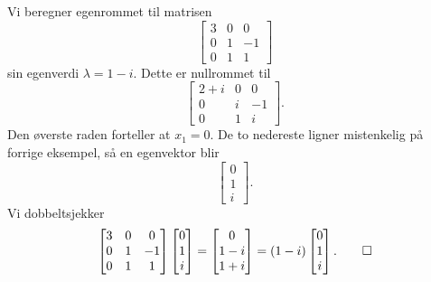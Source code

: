 \begin{ex}
Vi beregner egenrommet til matrisen
\[
\begin{bmatrix}
3 & 0 & 0 \\ 0 & 1 & -1 \\ 0&  1 &1  
\end{bmatrix}
\]
sin egenverdi $\lambda= 1-i$. Dette er nullrommet til
\[
\begin{bmatrix}
2+i & 0 & 0 \\ 0 & i & -1 \\ 0&  1 &i  
\end{bmatrix}.
\]
Den øverste raden forteller at $x_1=0$. De to nedereste ligner mistenkelig på forrige eksempel, så en egenvektor blir 
\[
\begin{bmatrix}
0 \\ 1  \\ i 
\end{bmatrix}.
\]
Vi dobbeltsjekker
\[
\begin{bmatrix}
3 & 0 & 0 \\ 0 & 1 & -1 \\ 0&  1 &1  
\end{bmatrix}
\begin{bmatrix}
0 \\ 1  \\ i 
\end{bmatrix}
=
\begin{bmatrix}
0 \\ 1-i  \\ 1+i 
\end{bmatrix}
=
(1-i)
\begin{bmatrix}
0 \\ 1  \\ i 
\end{bmatrix}. \qedhere
\]

\end{ex}


